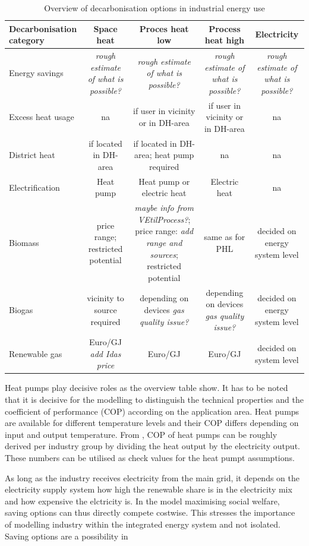 \documentclass[review]{elsarticle}
\begin{document}
\begin{table}
\begin{tabular}{l | c | c | c | c}
Decarbonisation category & Space heat & Proces heat low & Process heat high & Electricity \\
\hline \hline
Energy savings & \textit{rough estimate of what is possible?} & \textit{rough estimate of what is possible?} & \textit{rough estimate of what is possible?} & \textit{rough estimate of what is possible?}\\
Excess heat usage & na & if user in vicinity or in DH-area & if user in vicinity or in DH-area & na\\
District heat & if located in DH-area & if located in DH-area; heat pump required & na & na \\
Electrification & Heat pump & Heat pump or electric heat & Electric heat & na\\
Biomass & price range; restricted potential & \textit{maybe info from VEtilProcess?}; price range: \textit{add range and sources}; restricted potential & same as for PHL & decided on energy system level \\
Biogas & vicinity to source required & depending on devices \textit{gas quality issue?} & depending on devices \textit{gas quality issue?} & decided on energy system level \\
Renewable gas & Euro/GJ \textit{add Idas price} & Euro/GJ & Euro/GJ & decided on system level\\
\end{tabular}
\caption{Overview of decarbonisation options in industrial energy use}
\label{tab:temperature_levels} 
\end{table}

Heat pumps play decisive roles as the overview table show. It has to be noted that it is decisive for the modelling to distinguish the technical properties and the coefficient of performance (COP) according on the application area. Heat pumps are available for different temperature levels and their COP differs depending on input and output temperature. From \cite{VM2015}, COP of heat pumps can be roughly derived per industry group by dividing the heat output by the electricity output. These numbers can be utilised as check values for the heat pumpt assumptions.

As long as the industry receives electricity from the main grid, it depends on the electricity supply system how high the renewable share is in the electricity mix and how expensive the elctricity is. In the model maximising social welfare, saving options can thus directly compete costwise. This stresses the importance of modelling industry within the integrated energy system and not isolated. Saving options are a possibility in 
\end{document}
